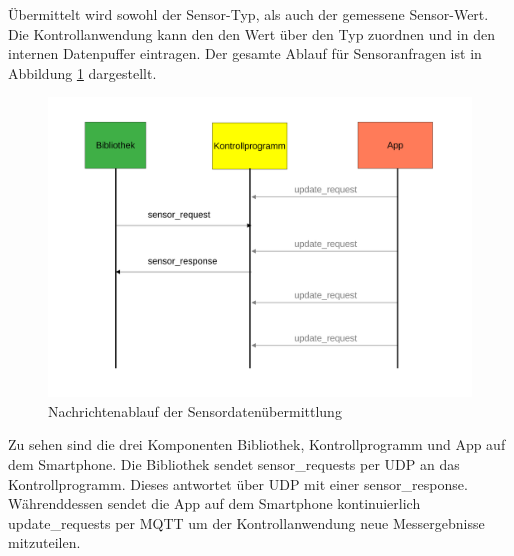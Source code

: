 \documentclass[11pt,a4paper]{report}
\begin{document}
Übermittelt wird sowohl der Sensor-Typ, als auch der gemessene Sensor-Wert.
Die Kontrollanwendung kann den den Wert über den Typ zuordnen und in den internen Datenpuffer eintragen.
Der gesamte Ablauf für Sensoranfragen ist in Abbildung \ref{fig:message_flow_requests} dargestellt.
\begin{figure}[htbp]
\centering
\includegraphics[width=.9\textwidth]{images/message_flow_sensor.pdf}
\caption{Nachrichtenablauf der Sensordatenübermittlung}
\label{fig:message_flow_requests}
\end{figure}
Zu sehen sind die drei Komponenten Bibliothek, Kontrollprogramm und App auf dem Smartphone.
Die Bibliothek sendet sensor\_requests per UDP an das Kontrollprogramm.
Dieses antwortet über UDP mit einer sensor\_response.
Währenddessen sendet die App auf dem Smartphone kontinuierlich update\_requests per MQTT um der Kontrollanwendung neue Messergebnisse mitzuteilen.
\end{document}

